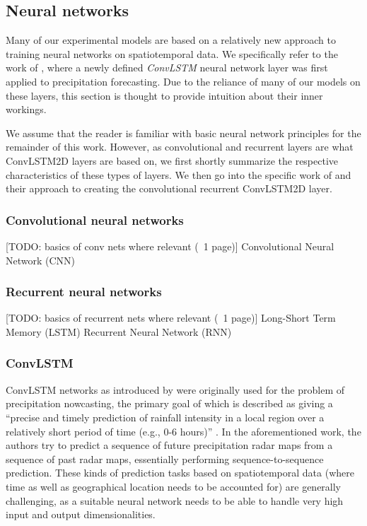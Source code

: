 \subsection{Neural networks}
\label{sst:neural_networks}
Many of our experimental models are based on a relatively new approach to training neural networks on spatiotemporal data. We specifically refer to the work of \citet{Shi.2015}, where a newly defined \textit{ConvLSTM} neural network layer was first applied to precipitation forecasting. Due to the reliance of many of our models on these layers, this section is thought to provide intuition about their inner workings.

We assume that the reader is familiar with basic neural network principles for the remainder of this work. However, as convolutional and recurrent layers are what ConvLSTM2D layers are based on, we first shortly summarize the respective characteristics of these types of layers. We then go into the specific work of \citet{Shi.2015} and their approach to creating the convolutional recurrent ConvLSTM2D layer.

\subsubsection{Convolutional neural networks}
\label{ssst:convolutional_networks}
[TODO: basics of conv nets where relevant (~1 page)]
Convolutional Neural Network (CNN)

\subsubsection{Recurrent neural networks}
\label{ssst:recurrent_networks}
[TODO: basics of recurrent nets where relevant (~1 page)]
Long-Short Term Memory (LSTM)
Recurrent Neural Network (RNN)

\subsubsection{ConvLSTM}
\label{ssst:conv_lstm_2d}
ConvLSTM networks as introduced by \citet{Shi.2015} were originally used for the problem of precipitation nowcasting, the primary goal of which is described as giving a ``precise and timely prediction of rainfall intensity in a local region over a relatively short period of time (e.g., 0-6 hours)'' \citep{Shi.2015}. In the aforementioned work, the authors try to predict a sequence of future precipitation radar maps from a sequence of past radar maps, essentially performing sequence-to-sequence prediction. These kinds of prediction tasks based on spatiotemporal data (where time as well as geographical location needs to be accounted for) are generally challenging, as a suitable neural network needs to be able to handle very high input and output dimensionalities.

